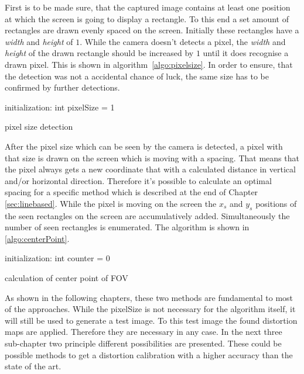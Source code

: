 \documentclass[journal,final,a4paper,twoside]{PS}
\begin{document}
First is to be made sure, that the captured image contains at least one position at which the screen is going to display a rectangle. To this end a set amount of rectangles are drawn evenly spaced on the screen. Initially these rectangles have a \emph{width} and \emph{height} of $1$. While the camera doesn't detects a pixel, the \emph{width} and \emph{height} of the drawn rectangle should be increased by $1$ until it does recognise a drawn pixel. This is shown in algorithm~\ref{algo:pixelsize}. In order to ensure, that the detection was not a accidental chance of luck, the same size has to be confirmed by further detections. \\
\begin{algorithm}[h]
 initialization: int pixelSize = 1\;
 \caption{pixel size detection}
 \label{algo:pixelsize}
\end{algorithm} 
 
After the pixel size which can be seen by the camera is detected, a pixel with that size is drawn on the screen which is moving with a spacing. That means that the pixel always gets a new coordinate that with a calculated distance in vertical and/or horizontal  direction. Therefore it's possible to calculate an optimal spacing for a specific method which is described at the end of Chapter \ref{sec:linebased}. While the pixel is moving on the screen the $x_s$ and $y_s$ positions of the seen rectangles on the screen are accumulatively added. Simultaneously the number of seen rectangles is enumerated. The algorithm is shown in \ref{algo:centerPoint}.
 
\begin{algorithm}[h]
 initialization: int counter = 0\;
 \caption{calculation of center point of FOV}
 \label{algo:centerPoint}
\end{algorithm} 

As shown in the following chapters, these two methods are fundamental to most of the approaches. While the pixelSize is not necessary for the algorithm itself, it will still be used to generate a test image. To this test image the found distortion maps are applied. Therefore they are necessary in any case. In the next three sub-chapter two principle different possibilities are presented. These could be possible methods to get a distortion calibration with a higher accuracy than the state of the art. 
\end{document}
